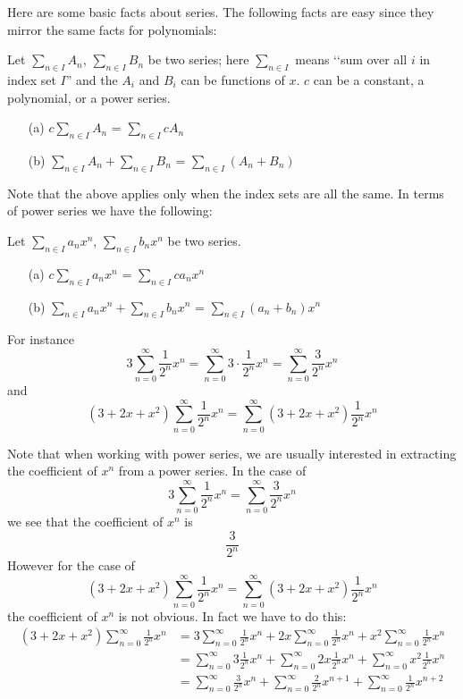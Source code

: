 Here are some basic facts about series.
The following facts are easy since they mirror the same facts for
polynomials:

\begin{prop}
Let $\sum_{n \in I} A_n$, $\sum_{n \in I} B_n$ be two series;
here $\sum_{n \in I}$ means \lq\lq sum over all $i$ in index set $I$''
and the $A_i$ and $B_i$ can be functions of $x$.
$c$ can be a constant, a polynomial, or a power series.
\begin{enumerate}
\item[\textnormal{(a)}] $c \sum_{n \in I} A_n$ = $\sum_{n \in I} cA_n$
\item[\textnormal{(b)}] $\sum_{n \in I} A_n + \sum_{n \in I} B_n$ = 
$\sum_{n \in I} (A_n + B_n)$
\end{enumerate}
\end{prop}

Note that the above applies only when the index sets are all the same.
In terms of power series we have the following:

\begin{prop}
Let $\sum_{n \in I} a_n x^n$, $\sum_{n \in I} b_n x^n$ be two series.
\begin{enumerate}
\item[\textnormal{(a)}] $c \sum_{n \in I} a_n x^n$ = $\sum_{n \in I} ca_n x^n$
\item[\textnormal{(b)}] $\sum_{n \in I} a_nx^n+ \sum_{n \in I} b_nx^n$ = 
$\sum_{n \in I} (a_n + b_n) x^n$
\end{enumerate}
\end{prop}

For instance
\[
3 \sum_{n = 0}^\infty \frac{1}{2^n}x^n
= \sum_{n = 0}^\infty 3 \cdot \frac{1}{2^n}x^n
= \sum_{n = 0}^\infty \frac{3}{2^n}x^n
\]
and 
\[
(3 + 2x + x^2) \sum_{n = 0}^\infty \frac{1}{2^n}x^n
= \sum_{n = 0}^\infty (3 + 2x + x^2) \frac{1}{2^n}x^n
\]

Note that when working with power series, we are usually interested
in extracting the coefficient of $x^n$ from a power series.
In the case of 
\[
3 \sum_{n = 0}^\infty \frac{1}{2^n}x^n
= \sum_{n = 0}^\infty \frac{3}{2^n}x^n
\]
we see that the coefficient of $x^n$ is
\[
\frac{3}{2^n}
\]
However for the case of 
\[
(3 + 2x + x^2) \sum_{n = 0}^\infty \frac{1}{2^n}x^n
= \sum_{n = 0}^\infty (3 + 2x + x^2) \frac{1}{2^n}x^n
\]
the coefficient of $x^n$ is not obvious.
In fact we have to do this:
\begin{align*}
(3 + 2x + x^2) \sum_{n = 0}^\infty \frac{1}{2^n}x^n
&= 3 \sum_{n = 0}^\infty \frac{1}{2^n}x^n
+ 2x \sum_{n = 0}^\infty \frac{1}{2^n}x^n
+ x^2 \sum_{n = 0}^\infty \frac{1}{2^n}x^n \\
&= \sum_{n = 0}^\infty 3 \frac{1}{2^n}x^n
+ \sum_{n = 0}^\infty 2x \frac{1}{2^n}x^n
+ \sum_{n = 0}^\infty x^2 \frac{1}{2^n}x^n \\
&= \sum_{n = 0}^\infty \frac{3}{2^n}x^n
+ \sum_{n = 0}^\infty \frac{2}{2^n}x^{n+1}
+ \sum_{n = 0}^\infty \frac{1}{2^n}x^{n+2} \\
\end{align*}


